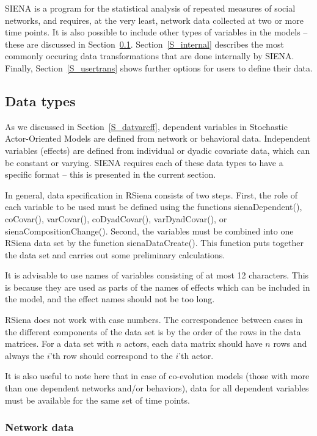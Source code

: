 \documentclass[a4paper,fleqn,11pt]{article}
\newcommand{\+}{\, + \,}
\newcommand{\sfn}[1]{\textsf{#1}}
\newcommand{\RS}{{\sf RSiena }}
\newcommand{\SI}{{\sf SIENA }}
\newcommand{\si}{{\sf SIENA}}
\newcommand{\saom}{{Stochastic Actor-Oriented Model}}
\begin{document}
\SI is a program for the statistical analysis
of repeated measures of social networks, and requires, at the very
least, network data collected at two or more time points. It is also possible
to include other types of variables in the models -- these are discussed in
Section~\ref{S_datatypes}. Section~\ref{S_internal} describes the most
commonly occuring
data transformations that are done internally by \si.
Finally, Section~\ref{S_usertrans}
shows further options for users to define their data.


\subsection{Data types}
\label{S_datatypes}

As we discussed in Section~\ref{S_datvareff}, dependent variables in {\saom}s are defined from
network or behavioral data. Independent variables (effects) are defined
from individual or dyadic covariate data, which can be constant or varying.
\SI requires each of these data types to have a specific format -- this is
presented in the current section.

In general, data specification in \RS consists of two steps.
First, the role of each variable to be used must be defined using
the functions \sfn{sienaDependent()}, \sfn{coCovar()}, \sfn{varCovar()},
\sfn{coDyadCovar()}, \sfn{varDyadCovar()}, or \sfn{sienaCompositionChange()}.
Second, the variables must be combined into one \RS data set by the function
\sfn{sienaDataCreate()}.
This function puts together the data set and carries out some
preliminary calculations.

It is advisable to use names of variables
consisting of at most 12 characters. This is because they are used as parts
of the names of effects which can be included in the model, and the effect
names should not be too long.

\RS does not work with case numbers. The correspondence between cases
in the different components of the data set is by the order of the rows
in the data matrices. For a data set with $n$ actors,
each data matrix should have $n$ rows and always the $i$'th row
should correspond to the $i$'th actor.

It is also useful to note here that in case of co-evolution models (those with
more than one dependent networks and/or behaviors), data for all dependent
variables must be available for the same set of time points.


\subsubsection{Network data}
\end{document}
